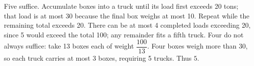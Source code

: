 Five suffice. Accumulate boxes into a truck until its load first exceeds 20 tons; that load is at most 30 because the final box weighs at most 10. Repeat while the remaining total exceeds 20. There can be at most 4 completed loads exceeding 20, since 5 would exceed the total 100; any remainder fits a fifth truck. Four do not always suffice: take 13 boxes each of weight $\dfrac{100}{13}$. Four boxes weigh more than 30, so each truck carries at most 3 boxes, requiring 5 trucks. Thus $\boxed5$.
